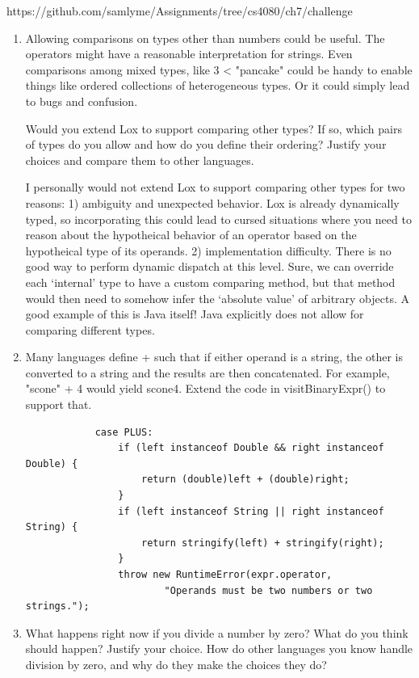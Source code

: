 \documentclass{article}
\begin{document}
https://github.com/samlyme/Assignments/tree/cs4080/ch7/challenge
\begin{enumerate}
    \item {
        Allowing comparisons on types other than numbers could be useful. The operators might have a reasonable interpretation for strings. Even comparisons among mixed types, like 3 < "pancake" could be handy to enable things like ordered collections of heterogeneous types. Or it could simply lead to bugs and confusion.

        Would you extend Lox to support comparing other types? If so, which pairs of types do you allow and how do you define their ordering? Justify your choices and compare them to other languages.

        I personally would not extend Lox to support comparing other types for 
        two reasons: 1) ambiguity and unexpected behavior. Lox is already 
        dynamically typed, so incorporating this could lead to cursed situations 
        where you need to reason about the hypotheical behavior of an operator 
        based on the hypotheical type of its operands. 2) implementation difficulty.
        There is no good way to perform dynamic dispatch at this level. Sure, we 
        can override each `internal' type to have a custom comparing method, but that
        method would then need to somehow infer the `absolute value' of arbitrary 
        objects. A good example of this is Java itself! Java explicitly does not 
        allow for comparing different types.
    }
    \item {
        Many languages define + such that if either operand is a string, the other is converted to a string and the results are then concatenated. For example, "scone" + 4 would yield scone4. Extend the code in visitBinaryExpr() to support that.

        \begin{lstlisting}
            case PLUS:
                if (left instanceof Double && right instanceof Double) {
                    return (double)left + (double)right;
                }
                if (left instanceof String || right instanceof String) {
                    return stringify(left) + stringify(right);
                }
                throw new RuntimeError(expr.operator,
                        "Operands must be two numbers or two strings.");
        \end{lstlisting}
    }

    \item {
        What happens right now if you divide a number by zero? What do you think should happen? Justify your choice. How do other languages you know handle division by zero, and why do they make the choices they do?

}
\end{enumerate}
\end{document}
